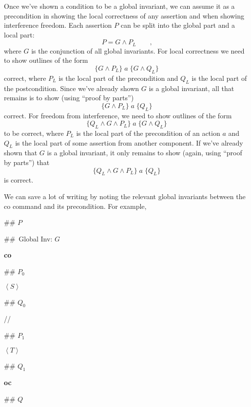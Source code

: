 \documentclass[11pt]{article}%
\begin{document}
Once we've shown a condition to be a global invariant, we can assume it as a
precondition in showing the local correctness of any assertion and when
showing interference freedom. Each assertion $P$ can be split into the global
part and a local part:%
\[
P=G\wedge P_{L}\qquad\text{,}%
\]
where $G$ is the conjunction of all global invariants. For local correctness
we need to show outlines of the form%
\[
\{G\wedge P_{L}\}\;a\;\{G\wedge Q_{L}\}
\]
correct, where $P_{L}$ is the local part of the precondition and $Q_{L}$ is
the local part of the postcondition. Since we've already shown $G$ is a global
invariant, all that remains is to show (using \textquotedblleft proof by
parts\textquotedblright)
\[
\{G\wedge P_{L}\}\;a\;\{Q_{L}\}
\]
correct. For freedom from interference, we need to show outlines of the form%
\[
\{Q_{L}\wedge G\wedge P_{L}\}\;a\;\{G\wedge Q_{L}\}
\]
to be correct, where $P_{L}$ is the local part of the precondition of an
action $a$ and $Q_{L}$ is the local part of some assertion from another
component. If we've already shown that $G$ is a global invariant, it only
remains to show (again, using \textquotedblleft proof by
parts\textquotedblright) that%
\[
\{Q_{L}\wedge G\wedge P_{L}\}\;a\;\{Q_{L}\}
\]
is correct.

We can save a lot of writing by noting the relevant global invariants between
the co command and its precondition. For example,

\begin{code}
\#\# $P$

\#\#\ Global Inv: $G$

\textbf{co}

\begin{indent}
\item \#\# $P_{0}$

\item $\left\langle S\right\rangle $

\item \#\# $Q_{0}$
\end{indent}

//

\begin{indent}
\item \#\# $P_{1}$

\item $\left\langle T\right\rangle $

\item \#\# $Q_{1}$
\end{indent}

\textbf{oc}

\#\# $Q$
\end{code}
\end{document}
